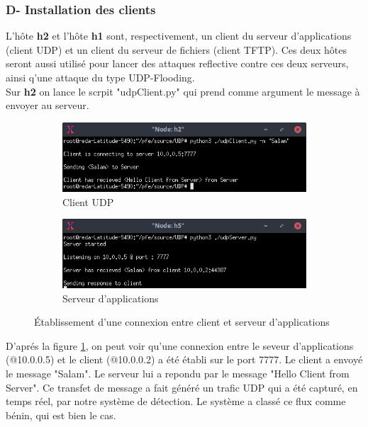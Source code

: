 \subsubsection{D- Installation des clients}
L'hôte \textbf{h2} et l'hôte \textbf{h1} sont, respectivement, un client du serveur d'applications (client UDP) et un client du serveur de fichiers (client TFTP). Ces deux hôtes seront aussi utilisé pour lancer des attaques reflective contre ces deux serveurs, ainsi q'une attaque du type UDP-Flooding.\\
Sur \textbf{h2} on lance le scrpit "udpClient.py" qui prend comme argument le message à envoyer au serveur.
\begin{figure}[h]
\centering
\begin{subfigure}{12.5cm}
\centering
\includegraphics[width=\textwidth]{Figures/simulation/mininet/UDP/client/Benign}
\caption{Client UDP}
\end{subfigure}
\vskip 0.4cm
\begin{subfigure}{12.5cm}
\centering
\includegraphics[width=\textwidth]{Figures/simulation/mininet/UDP/server/benign_request}
\caption{Serveur d'applications}
\end{subfigure}
\vskip 0.3cm
\decoRule
\caption{Établissement d'une connexion entre client et serveur d'applications}
\label{fig:c/s_UDP}
\end{figure}
\newpage
D'aprés la figure \ref{fig:c/s_UDP}, on peut voir qu'une connexion entre le seveur d'applications (@10.0.0.5) et le client (@10.0.0.2) a été établi sur le port 7777. Le client a envoyé le message "Salam". Le serveur lui a repondu par le message "Hello Client from Server". Ce transfet de message a fait généré un trafic UDP qui a été capturé, en temps réel, par notre système de détection. Le système a classé ce flux comme bénin, qui est bien le cas. 
